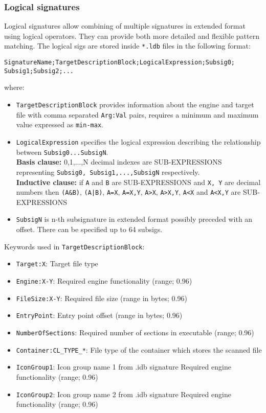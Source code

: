 \documentclass[a4paper,titlepage,12pt]{article}
\begin{document}
    \subsubsection{Logical signatures}\label{ndb}
    Logical signatures allow combining of multiple signatures in extended
    format using logical operators. They can provide both more detailed and
    flexible pattern matching. The logical sigs are stored inside \verb+*.ldb+
    files in the following format:
    \begin{verbatim}
SignatureName;TargetDescriptionBlock;LogicalExpression;Subsig0;
Subsig1;Subsig2;...
    \end{verbatim}
    where:
    \begin{itemize}
	\item \verb+TargetDescriptionBlock+ provides information about the
	engine and target file with comma separated \verb+Arg:Val+ pairs,
	requires a minimum and maximum value expressed as \verb+min-max+.
	\item \verb+LogicalExpression+ specifies the logical expression
	describing the relationship between \verb+Subsig0...SubsigN+.\\
	\textbf{Basis clause:} 0,1,...,N decimal indexes are SUB-EXPRESSIONS
	representing \verb+Subsig0, Subsig1,...,SubsigN+ respectively.\\
	\textbf{Inductive clause:} if \verb+A+ and \verb+B+ are
	SUB-EXPRESSIONS and \verb+X, Y+ are decimal numbers then
	\verb+(A&B)+, \verb+(A|B)+, \verb+A=X+, \verb+A=X,Y+, \verb+A>X+,
	\verb+A>X,Y+, \verb+A<X+ and \verb+A<X,Y+ are SUB-EXPRESSIONS
	\item \verb+SubsigN+ is n-th subsignature in extended format possibly
	preceded with an offset. There can be specified up to 64 subsigs.
    \end{itemize}
    Keywords used in \verb+TargetDescriptionBlock+:
    \begin{itemize}
	\item \verb+Target:X+: Target file type
	\item \verb+Engine:X-Y+: Required engine functionality (range; 0.96)
	\item \verb+FileSize:X-Y+: Required file size (range in bytes; 0.96)
	\item \verb+EntryPoint+: Entry point offset (range in bytes; 0.96)
	\item \verb+NumberOfSections+: Required number of sections in executable (range; 0.96)
	\item \verb+Container:CL_TYPE_*+: File type of the container which stores the scanned file
	\item \verb+IconGroup1+: Icon group name 1 from .idb signature Required engine functionality (range; 0.96)
	\item \verb+IconGroup2+: Icon group name 2 from .idb signature Required engine functionality (range; 0.96)
    \end{itemize}
\end{document}
